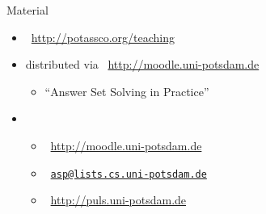 \begin{frame}{Material}
  \bigskip
  \begin{itemize}\itemsep 0pt
  \item {} \ \url{http://potassco.org/teaching}
    \medskip
  \item {} distributed via \ \url{http://moodle.uni-potsdam.de}
    \begin{itemize}
    \item {} ``Answer Set Solving in Practice''
    \end{itemize}
    \medskip
  \item {}
    \begin{itemize}
    \item {}      \ \url{http://moodle.uni-potsdam.de}
    \item {}          \ \href{mailto:asp@lists.cs.uni-potsdam.de}{\texttt{asp@lists.cs.uni-potsdam.de}}
    \item {} \ \url{http://puls.uni-potsdam.de}
    \end{itemize}
    \medskip
  \end{itemize}
\end{frame}
